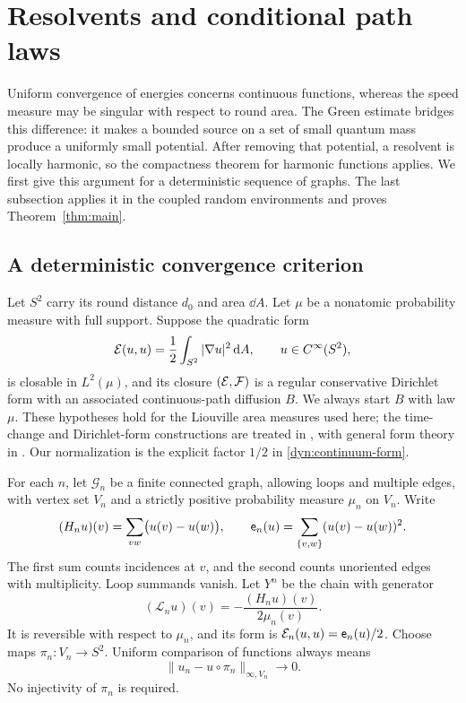 \section{Resolvents and conditional path laws}\label{sec:dynamics}

Uniform convergence of energies concerns continuous functions, whereas
the speed measure may be singular with respect to round area.  The
Green estimate bridges this difference: it makes a bounded source on
a set of small quantum mass produce a uniformly small potential.
After removing that potential, a resolvent is locally harmonic, so
the compactness theorem for harmonic functions applies.  We first
give this argument for a deterministic sequence of graphs.  The last
subsection applies it in the coupled random environments and proves
Theorem~\ref{thm:main}.

\subsection{A deterministic convergence criterion}

Let $S^2$ carry its round distance $d_0$ and area $\dd A$.  Let $\mu$
be a nonatomic probability measure with full support.  Suppose the
quadratic form
\begin{equation}\label{dyn:continuum-form}
 \mathcal E(u,u)=\frac12\int_{S^2}|\nabla u|^2\,\mathrm d A,
 \qquad u\in C^\infty(S^2),
\end{equation}
is closable in $L^2(\mu)$, and its closure $(\mathcal E,\mathcal F)$ is a
regular conservative Dirichlet form with an associated continuous-path
diffusion $B$.  We always start $B$ with law $\mu$.  These hypotheses
hold for the Liouville area measures used here; the time-change and
Dirichlet-form constructions are treated in
\cite{GRV,Berestycki}, with general form theory in \cite{FOT}.
Our normalization is the explicit factor $1/2$ in
\eqref{dyn:continuum-form}.

For each $n$, let $\mathcal G_n$ be a finite connected graph, allowing loops and
multiple edges, with vertex set $V_n$ and a strictly positive
probability measure $\mu_n$ on $V_n$.  Write
\[
 (H_nu)(v)=\sum_{vw}\bigl(u(v)-u(w)\bigr),
 \qquad
 \mathsf e_n(u)=\sum_{\{v,w\}}(u(v)-u(w))^2.
\]
The first sum counts incidences at $v$, and the second counts
unoriented edges with multiplicity.  Loop summands vanish.
Let $Y^n$ be the chain with generator
\begin{equation}\label{dyn:abstract-generator}
 (\mathcal L_nu)(v)=-\frac{(H_nu)(v)}{2\mu_n(v)}.
\end{equation}
It is reversible with respect to $\mu_n$, and its form is
$\mathcal E_n(u,u)=\mathsf e_n(u)/2$.  Choose maps $\pi_n:V_n\to S^2$.
Uniform comparison of functions always means
\[
 \|u_n-u\circ\pi_n\|_{\infty,V_n}\longrightarrow0.
\]
No injectivity of $\pi_n$ is required.

